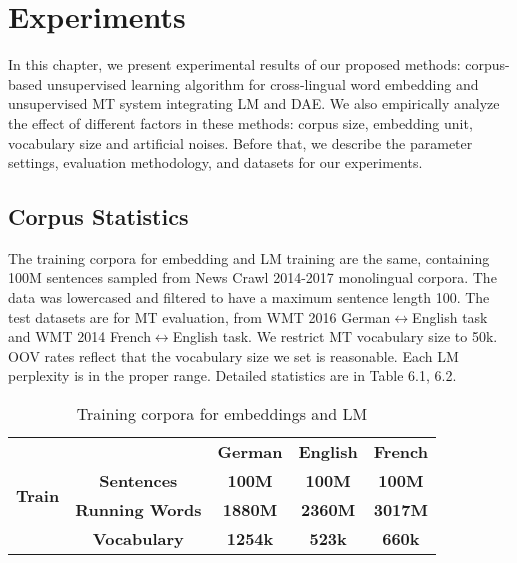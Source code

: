 \chapter{Experiments}
In this chapter, we present experimental results of our proposed methods: corpus-based unsupervised learning algorithm for cross-lingual word embedding and unsupervised MT system integrating LM and DAE. We also empirically analyze the effect of different factors in these methods: corpus size, embedding unit, vocabulary size and artificial noises. Before that, we describe the parameter settings, evaluation methodology, and datasets for our experiments.



\section{Corpus Statistics}
 The training corpora for embedding and LM training are the same, containing 100M sentences
 sampled from News Crawl 2014-2017 monolingual
 corpora. The data was lowercased and filtered
 to have a maximum sentence length 100. The test datasets are for MT evaluation, from WMT 2016   German$\leftrightarrow$English task and WMT 2014 French$\leftrightarrow$English task. We restrict MT vocabulary size to 50k. OOV rates reflect that the vocabulary size we set is reasonable. Each LM perplexity is in the proper range. Detailed statistics are in Table 6.1, 6.2.
\begin{table}[H]
	\centering
	\begin{tabular}{c|c|c|c|c}
		\hline
		\multirow{4}{*}{\textbf{Train}} & \textbf{}              & \textbf{German} & \textbf{English} & \textbf{French} \\ \cline{2-5} 
		& \textbf{Sentences}     & \textbf{100M}   & \textbf{100M}    & \textbf{100M}   \\ \cline{2-5} 
		& \textbf{Running Words} & \textbf{1880M}  & \textbf{2360M}   & \textbf{3017M}  \\ \cline{2-5} 
		& \textbf{Vocabulary}    & \textbf{1254k}  & \textbf{523k}    & \textbf{660k}   \\ \hline
	\end{tabular}
	\caption{Training corpora for embeddings and LM}
\end{table}

